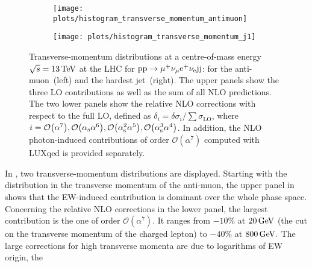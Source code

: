 \documentclass[a4article,11pt]{article}
\begin{document}
\begin{figure}
        \setlength{\parskip}{-10pt}
        \begin{subfigure}{0.49\textwidth}
                \subcaption{}
                \texttt{[image: plots/histogram\_transverse\_momentum\_antimuon]}
                \label{plot:transverse_momentum_antimuon}
        \end{subfigure}
        \hfill
        \begin{subfigure}{0.49\textwidth}
                \subcaption{}
                \texttt{[image: plots/histogram\_transverse\_momentum\_j1]}
                \label{plot:transverse_momentum_harder_jet} 
        \end{subfigure}
     
        \vspace*{-3ex}
        \caption{\label{fig:transverse_momentum_distributions}%
                Transverse-momentum distributions at a centre-of-mass energy $\sqrt{s}=13\,\text{TeV}$ at the LHC for $\text{p}\text{p}\to\mu^+\nu_\mu\text{e}^+\nu_{\text{e}}\text{j}\text{j}$: 
                 for the anti-muon~(left) 
                and %
                 the hardest jet~(right).
                The upper panels show the three LO contributions as well as the sum of all NLO predictions.
                The two lower panels show the relative NLO corrections with respect to the full LO, defined as $\delta_i = \delta \sigma_{i} / \sum \sigma_{\text{LO}}$, 
                where $i=\mathcal{O}{\left(\alpha^{7}\right)},\mathcal{O}{\left(\alpha_\text{s}\alpha^{6}\right)},\mathcal{O}{\left(\alpha_\text{s}^2\alpha^{5}\right)},\mathcal{O}{\left(\alpha_\text{s}^3\alpha^{4}\right)}$.
                In addition, the NLO photon-induced contributions of order $\mathcal{O}{\left(\alpha^{7}\right)}$ computed with LUXqed is provided separately.}
\end{figure}
%
In , two
transverse-momentum distributions are displayed.
Starting with the distribution in the  transverse 
momentum of the anti-muon, the upper panel  in
 shows  that the EW-induced 
contribution is dominant over the whole phase space. 
Concerning the relative NLO corrections in the lower panel, the largest 
contribution is the one of order $\mathcal{O}{\left(\alpha^{7}\right)}$.
It ranges from $-10\%$ at $20\,\text{GeV}$ (the cut on the transverse momentum
of the charged lepton) to $-40\%$ at $800\,\text{GeV}.$ The large corrections
for high transverse momenta are due to logarithms of EW origin, the
\end{document}
